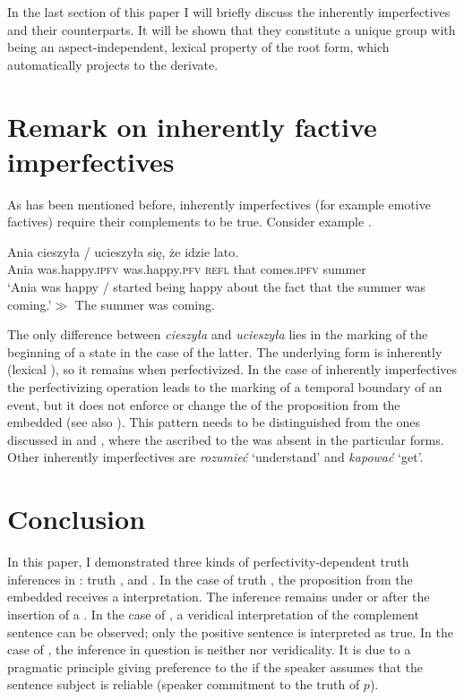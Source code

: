 \documentclass[output=paper,  modfonts,  newtxmath,  hidelinks		  ]{langscibook}
\begin{document}
In the last section of this paper I will briefly discuss the inherently  imperfectives and their  counterparts. It will be shown that they constitute a unique group with  being an aspect-independent, lexical property of the root form, which automatically projects to the  derivate.

\section{Remark on inherently factive imperfectives}
\largerpage

As has been mentioned before, inherently  imperfectives (for example emotive factives) require their complements to be true. Consider example .

\ea\label{21:inh}
\gll Ania cieszyła / ucieszyła się, że idzie lato.\\
Ania was.happy.\textsc{ipfv} {} was.happy.\textsc{pfv} \textsc{refl} that comes.\textsc{ipfv} summer\\
\glt	`Ania was happy / started being happy about the fact that the summer was coming.'\newline$\gg$ The summer was coming.
\z

\noindent The only difference between \textit{cieszyła} and \textit{ucieszyła} lies in the marking of the beginning of a state in the case of the latter. The underlying  form is inherently  (lexical ), so it remains  when perfectivized. In the case of inherently  imperfectives the perfectivizing operation leads to the marking of a temporal boundary of an event, but it does not enforce or change the  of the proposition from the embedded  (see also ). This pattern needs to be distinguished from the ones discussed in  and , where the  ascribed to the  was absent in the particular  forms. Other inherently  imperfectives are \textit{rozumieć} `understand’ and \textit{kapować} `get’.

\section{Conclusion}
In this paper, I demonstrated three kinds of perfectivity-dependent truth inferences in : truth ,  and . In the case of truth , the proposition from the embedded  receives a  interpretation. The inference remains under  or after the insertion of a . In the case of , a veridical interpretation of the complement sentence can be observed; only the positive sentence is interpreted as true. In the case of , the inference in question is neither  nor veridicality. It is due to a pragmatic principle giving preference to the  if the speaker assumes that the sentence subject is reliable (speaker commitment to the truth of $p$).
\end{document}
